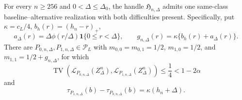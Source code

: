 For every \(n\ge256\) and \(0<\Delta\le\Delta_0\), the handle \(\mathfrak H_{n,\Delta}\) admits one same-class baseline--alternative realization with both difficulties present.  Specifically, put \(\kappa=c_L/4\), \(b_h(r)=(h_n-r)_+\),
\[
 a_\Delta(r)=\Delta\phi(r/\Delta)\mathbf 1\{0\le r<\Delta\},
 \qquad
 g_{n,\Delta}(r)=\kappa\{b_h(r)+a_\Delta(r)\}.
\]
There are \(P_{0,n,\Delta},P_{1,n,\Delta}\in\mathcal P_L\) with \(m_{0,0}=m_{0,1}=1/2\), \(m_{1,0}=1/2\), and \(m_{1,1}=1/2+g_{n,\Delta}\), for which
\[
 \operatorname{TV}\!\left(\mathcal L_{P_{0,n,\Delta}}(Z_\Delta^n),
 \mathcal L_{P_{1,n,\Delta}}(Z_\Delta^n)\right)
 \le\frac14<1-2\alpha
\]
and
\[
 \tau_{P_{1,n,\Delta}}(b)-\tau_{P_{0,n,\Delta}}(b)
 =\kappa(h_n+\Delta).
\]